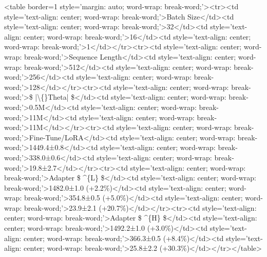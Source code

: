 \documentclass[conference]{IEEEtran}
\begin{document}
\textless{}table border=1 style='margin: auto; word-wrap: break-word;'\textgreater{}\textless{}tr\textgreater{}\textless{}td style='text-align: center; word-wrap: break-word;'\textgreater{}Batch Size\textless{}/td\textgreater{}\textless{}td style='text-align: center; word-wrap: break-word;'\textgreater{}32\textless{}/td\textgreater{}\textless{}td style='text-align: center; word-wrap: break-word;'\textgreater{}16\textless{}/td\textgreater{}\textless{}td style='text-align: center; word-wrap: break-word;'\textgreater{}1\textless{}/td\textgreater{}\textless{}/tr\textgreater{}\textless{}tr\textgreater{}\textless{}td style='text-align: center; word-wrap: break-word;'\textgreater{}Sequence Length\textless{}/td\textgreater{}\textless{}td style='text-align: center; word-wrap: break-word;'\textgreater{}512\textless{}/td\textgreater{}\textless{}td style='text-align: center; word-wrap: break-word;'\textgreater{}256\textless{}/td\textgreater{}\textless{}td style='text-align: center; word-wrap: break-word;'\textgreater{}128\textless{}/td\textgreater{}\textless{}/tr\textgreater{}\textless{}tr\textgreater{}\textless{}td style='text-align: center; word-wrap: break-word;'\textgreater{}\$ |\textbackslash\{\}Theta| \$\textless{}/td\textgreater{}\textless{}td style='text-align: center; word-wrap: break-word;'\textgreater{}0.5M\textless{}/td\textgreater{}\textless{}td style='text-align: center; word-wrap: break-word;'\textgreater{}11M\textless{}/td\textgreater{}\textless{}td style='text-align: center; word-wrap: break-word;'\textgreater{}11M\textless{}/td\textgreater{}\textless{}/tr\textgreater{}\textless{}tr\textgreater{}\textless{}td style='text-align: center; word-wrap: break-word;'\textgreater{}Fine-Tune/LoRA\textless{}/td\textgreater{}\textless{}td style='text-align: center; word-wrap: break-word;'\textgreater{}1449.4±0.8\textless{}/td\textgreater{}\textless{}td style='text-align: center; word-wrap: break-word;'\textgreater{}338.0±0.6\textless{}/td\textgreater{}\textless{}td style='text-align: center; word-wrap: break-word;'\textgreater{}19.8±2.7\textless{}/td\textgreater{}\textless{}/tr\textgreater{}\textless{}tr\textgreater{}\textless{}td style='text-align: center; word-wrap: break-word;'\textgreater{}Adapter \$ \textasciicircum{}\{L\} \$\textless{}/td\textgreater{}\textless{}td style='text-align: center; word-wrap: break-word;'\textgreater{}1482.0±1.0 (+2.2\%)\textless{}/td\textgreater{}\textless{}td style='text-align: center; word-wrap: break-word;'\textgreater{}354.8±0.5 (+5.0\%)\textless{}/td\textgreater{}\textless{}td style='text-align: center; word-wrap: break-word;'\textgreater{}23.9±2.1 (+20.7\%)\textless{}/td\textgreater{}\textless{}/tr\textgreater{}\textless{}tr\textgreater{}\textless{}td style='text-align: center; word-wrap: break-word;'\textgreater{}Adapter \$ \textasciicircum{}\{H\} \$\textless{}/td\textgreater{}\textless{}td style='text-align: center; word-wrap: break-word;'\textgreater{}1492.2±1.0 (+3.0\%)\textless{}/td\textgreater{}\textless{}td style='text-align: center; word-wrap: break-word;'\textgreater{}366.3±0.5 (+8.4\%)\textless{}/td\textgreater{}\textless{}td style='text-align: center; word-wrap: break-word;'\textgreater{}25.8±2.2 (+30.3\%)\textless{}/td\textgreater{}\textless{}/tr\textgreater{}\textless{}/table\textgreater{}
\end{document}
